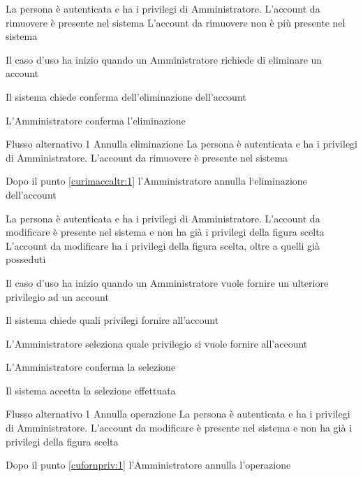 {}
{La persona è autenticata e ha i privilegi di Amministratore. L'account da rimuovere è presente nel sistema}
{L'account da rimuovere non è più presente nel sistema}
{\begin{enumCU}
	\item Il caso d'uso ha inizio quando un Amministratore richiede di eliminare un account
	\item Il sistema chiede conferma dell'eliminazione dell'account \label{curimaccaltr:1}
	\item L'Amministratore conferma l'eliminazione
\end{enumCU}}
%
{Flusso alternativo 1}%
{Annulla eliminazione}%
{La persona è autenticata e ha i privilegi di Amministratore. L'account da rimuovere è presente nel sistema}%
{\postNulle}%
{\begin{enumCU}
		\item Dopo il punto \ref{curimaccaltr:1} l'Amministratore annulla l`eliminazione dell'account
	\end{enumCU}}%

\tabcuvspace

{}
{La persona è autenticata e ha i privilegi di Amministratore. L'account da modificare è presente nel sistema e non ha già i privilegi della figura scelta}
{L'account da modificare ha i privilegi della figura scelta, oltre a quelli già posseduti}
{\begin{enumCU}
	\item Il caso d'uso ha inizio quando un Amministratore vuole fornire un ulteriore privilegio ad un account
	\item Il sistema chiede quali privilegi fornire all'account 
	\item L'Amministratore seleziona quale privilegio si vuole fornire all'account \label{cufornpriv:1}
	\item L'Amministratore conferma la selezione
	\item Il sistema accetta la selezione effettuata
\end{enumCU}}
%
{Flusso alternativo 1}%
{Annulla operazione}%
{La persona è autenticata e ha i privilegi di Amministratore. L'account da modificare è presente nel sistema e non ha già i privilegi della figura scelta}%
{\postNulle}%
{\begin{enumCU}
		\item Dopo il punto \ref{cufornpriv:1} l'Amministratore annulla l'operazione
	\end{enumCU}}%

